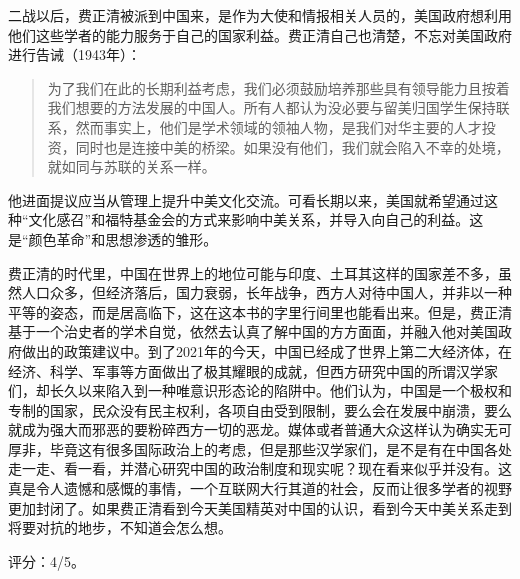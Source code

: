 二战以后，费正清被派到中国来，是作为大使和情报相关人员的，美国政府想利用他们这些学者的能力服务于自己的国家利益。费正清自己也清楚，不忘对美国政府进行告诫（1943年）：
\begin{quotation}
为了我们在此的长期利益考虑，我们必须鼓励培养那些具有领导能力且按着我们想要的方法发展的中国人。所有人都认为没必要与留美归国学生保持联系，然而事实上，他们是学术领域的领袖人物，是我们对华主要的人才投资，同时也是连接中美的桥梁。如果没有他们，我们就会陷入不幸的处境，就如同与苏联的关系一样。
\end{quotation}

他进面提议应当从管理上提升中美文化交流。可看长期以来，美国就希望通过这种“文化感召”和福特基金会的方式来影响中美关系，并导入向自己的利益。这是“颜色革命”和思想渗透的雏形。

费正清的时代里，中国在世界上的地位可能与印度、土耳其这样的国家差不多，虽然人口众多，但经济落后，国力衰弱，长年战争，西方人对待中国人，并非以一种平等的姿态，而是居高临下，这在这本书的字里行间里也能看出来。但是，费正清基于一个治史者的学术自觉，依然去认真了解中国的方方面面，并融入他对美国政府做出的政策建议中。到了2021年的今天，中国已经成了世界上第二大经济体，在经济、科学、军事等方面做出了极其耀眼的成就，但西方研究中国的所谓汉学家们，却长久以来陷入到一种唯意识形态论的陷阱中。他们认为，中国是一个极权和专制的国家，民众没有民主权利，各项自由受到限制，要么会在发展中崩溃，要么就成为强大而邪恶的要粉碎西方一切的恶龙。媒体或者普通大众这样认为确实无可厚非，毕竟这有很多国际政治上的考虑，但是那些汉学家们，是不是有在中国各处走一走、看一看，并潜心研究中国的政治制度和现实呢？现在看来似乎并没有。这真是令人遗憾和感慨的事情，一个互联网大行其道的社会，反而让很多学者的视野更加封闭了。如果费正清看到今天美国精英对中国的认识，看到今天中美关系走到将要对抗的地步，不知道会怎么想。

评分：4/5。